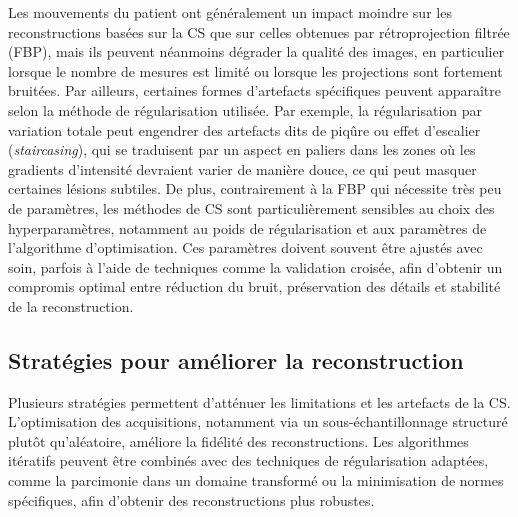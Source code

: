 Les mouvements du patient ont généralement un impact moindre sur les reconstructions basées sur la CS que sur celles obtenues par rétroprojection filtrée (FBP), mais ils peuvent néanmoins dégrader la qualité des images, en particulier lorsque le nombre de mesures est limité ou lorsque les projections sont fortement bruitées. Par ailleurs, certaines formes d'artefacts spécifiques peuvent apparaître selon la méthode de régularisation utilisée. Par exemple, la régularisation par variation totale peut engendrer des artefacts dits de  piqûre  ou effet d'escalier (\textit{staircasing}), qui se traduisent par un aspect en paliers dans les zones où les gradients d'intensité devraient varier de manière douce, ce qui peut masquer certaines lésions subtiles. De plus, contrairement à la FBP qui nécessite très peu de paramètres, les méthodes de CS sont particulièrement sensibles au choix des hyperparamètres, notamment au poids de régularisation et aux paramètres de l'algorithme d'optimisation. Ces paramètres doivent souvent être ajustés avec soin, parfois à l'aide de techniques comme la validation croisée, afin d'obtenir un compromis optimal entre réduction du bruit, préservation des détails et stabilité de la reconstruction.

\subsection{Stratégies pour améliorer la reconstruction}

Plusieurs stratégies permettent d'atténuer les limitations et les artefacts de la CS. L'optimisation des acquisitions, notamment via un sous-échantillonnage structuré plutôt qu'aléatoire, améliore la fidélité des reconstructions. Les algorithmes itératifs peuvent être combinés avec des techniques de régularisation adaptées, comme la parcimonie dans un domaine transformé ou la minimisation de normes spécifiques, afin d'obtenir des reconstructions plus robustes.

